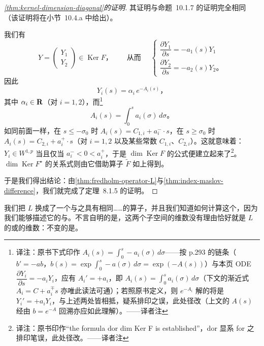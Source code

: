 \begin{proof}[\cref{thm:kernel-dimension-diagonal}的证明]
其证明与命题~10.1.7 的证明完全相同（该证明将在小节~10.4.a 中给出）。

我们有
\[
Y=\left(\begin{array}{c}Y_1\\Y_2\end{array}\right)\in\operatorname{Ker}F\text{，}
\qquad\text{从而 }\quad
\left\{\begin{array}{l}
\dfrac{\partial Y_1}{\partial s}=-a_1(s)Y_1\\[6pt]
\dfrac{\partial Y_2}{\partial s}=-a_2(s)Y_2\text{。}
\end{array}\right.
\]
因此
\[
Y_i(s)=\alpha_i\,e^{-A_i(s)}\text{，}
\]
其中 $\alpha_i\in\mathbf{R}$（对 $i=1,2$），而\footnote{译注：原书下式印作 $A_i(s)=\int_0^{s}-a_i(\sigma)\,d\sigma$——按 p.293 的链条（$b'=-ab$，$b(s)=\exp\int_0^{s}-a(\sigma)\,d\sigma=\exp(-A(s))$）与本页 ODE $\dfrac{\partial Y_i}{\partial s}=-a_iY_i$，应有 $A_i'=+a_i$，即 $A_i(s)=\int_0^{s}a_i(\sigma)\,d\sigma$（下文的渐近式 $A_i=C+a_i^{\mp}s$ 亦唯此读法可通）；若照原书定义，则 $e^{-A_i}$ 解的将是 $Y_i'=+a_iY_i$，与上述两处皆相抵，疑系排印之误，此处径改（上文的 $A(s)$ 经由 $b=e^{-A}$ 回溯亦应如此理解）。——译者注}
\[
A_i(s)=\int_0^{s}a_i(\sigma)\,d\sigma\text{。}
\]
如同前面一样，在 $s\le-\sigma_0$ 时 $A_i(s)=C_{1,i}+a_i^{-}\cdot s$，在 $s\ge\sigma_0$ 时 $A_i(s)=C_{2,i}+a_i^{+}\cdot s$（对 $i=1,2$ 以及某些常数 $C_{1,i}$、$C_{2,i}$）。这就意味着：$Y_i\in W^{1,p}$ 当且仅当 $a_i^{-}<0<a_i^{+}$，于是 $\dim\operatorname{Ker}F$ 的公式便建立起来了\footnote{译注：原书印作“the formula dor dim Ker F is established”，dor 显系 for 之排印笔误，此处径改。——译者注}。$\dim\operatorname{Ker}F^{\star}$ 的关系式则由它借助算子 $\widetilde{F}$ 如上得到。

于是我们得出结论：由\cref{thm:fredholm-operator-L}与\cref{thm:index-maslov-difference}，我们就完成了定理~8.1.5 的证明。
\end{proof}

\begin{remark}\label{thm:index-invariant}
我们把\trFredholmOperator{} $L$ 换成了一个与之具有相同\trIndex……的算子，并且我们知道如何计算这个\trIndex，因为我们能够描述它的\trKernel{}与\trCokernel。不言自明的是，这两个子空间的维数没有理由恰好就是 $L$ 的\trKernel{}或\trCokernel{}的维数：不变的是\trIndex。
\end{remark}
